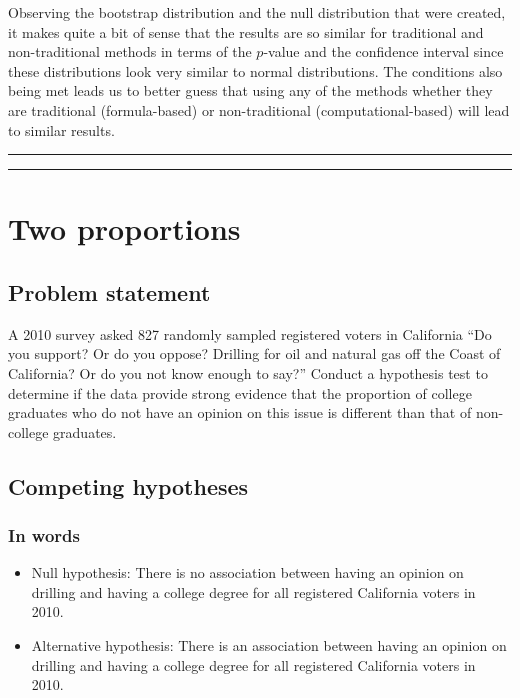 \documentclass[12pt,]{krantz}
\begin{document}
Observing the bootstrap distribution and the null distribution that were
created, it makes quite a bit of sense that the results are so similar
for traditional and non-traditional methods in terms of the \(p\)-value
and the confidence interval since these distributions look very similar
to normal distributions. The conditions also being met leads us to
better guess that using any of the methods whether they are traditional
(formula-based) or non-traditional (computational-based) will lead to
similar results.

\begin{center}\rule{0.5\linewidth}{\linethickness}\end{center}

\begin{center}\rule{0.5\linewidth}{\linethickness}\end{center}

\section{Two proportions}\label{two-proportions}

\subsection{Problem statement}\label{problem-statement-2}

A 2010 survey asked 827 randomly sampled registered voters in California
``Do you support? Or do you oppose? Drilling for oil and natural gas off
the Coast of California? Or do you not know enough to say?'' Conduct a
hypothesis test to determine if the data provide strong evidence that
the proportion of college graduates who do not have an opinion on this
issue is different than that of non-college graduates. \citep[Tweaked a
bit from][ {[}Chapter 6{]}]{isrs2014}

\subsection{Competing hypotheses}\label{competing-hypotheses-2}

\subsubsection*{In words}\label{in-words-2}


\begin{itemize}
\item
  Null hypothesis: There is no association between having an opinion on
  drilling and having a college degree for all registered California
  voters in 2010.
\item
  Alternative hypothesis: There is an association between having an
  opinion on drilling and having a college degree for all registered
  California voters in 2010.
\end{itemize}
\end{document}
